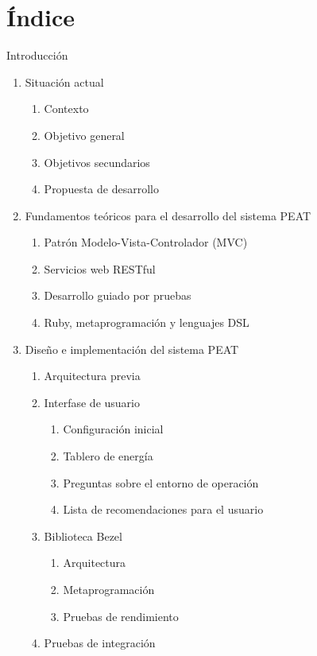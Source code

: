 \documentclass{article}
\begin{document}
\section{Índice}
Introducción
\begin{enumerate}
\item Situación actual
  \begin{enumerate}[label*=\arabic*.]
  \item{Contexto}
  \item{Objetivo general}
  \item{Objetivos secundarios}
  \item{Propuesta de desarrollo}
  \end{enumerate}
\item Fundamentos teóricos para el desarrollo del sistema PEAT
  \begin{enumerate}[label*=\arabic*.]
  \item{Patrón Modelo-Vista-Controlador (MVC)}
  \item{Servicios web RESTful}
  \item{Desarrollo guiado por pruebas}
  \item{Ruby, metaprogramación y lenguajes DSL}
  \end{enumerate}
\item Diseño e implementación del sistema PEAT
  \begin{enumerate}[label*=\arabic*.]
  \item Arquitectura previa
  \item Interfase de usuario
    \begin{enumerate}[label*=\arabic*.]
    \item Configuración inicial
    \item Tablero de energía
    \item Preguntas sobre el entorno de operación
    \item Lista de recomendaciones para el usuario
    \end{enumerate}
  \item Biblioteca Bezel
    \begin{enumerate}[label*=\arabic*.]
    \item Arquitectura
    \item Metaprogramación
    \item Pruebas de rendimiento
    \end{enumerate}
  \item Pruebas de integración
    \begin{enumerate}[label*=\arabic*.]

\end{enumerate}
\end{enumerate}
\end{enumerate}
\end{document}
